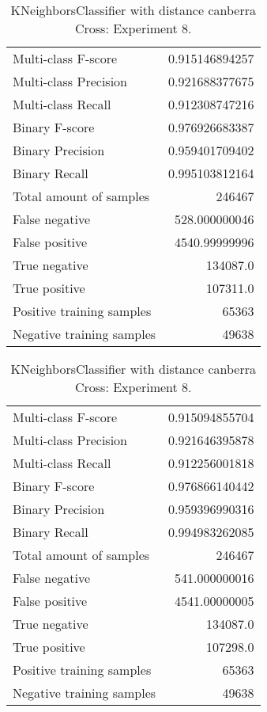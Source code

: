 \begin{table}[H]
\begin{minipage}{0.5\textwidth}
\caption{KNeighborsClassifier with distance canberra Cross: Experiment 7.}
\centering
\begin{tabular}{l r}
\toprule
Multi-class F-score & 0.915146894257 \\
Multi-class Precision & 0.921688377675 \\
Multi-class Recall & 0.912308747216 \\
\midrule
Binary F-score & 0.976926683387 \\
Binary Precision & 0.959401709402 \\
Binary Recall & 0.995103812164 \\
\midrule
Total amount of samples & 246467 \\
False negative & 528.000000046 \\
False positive & 4540.99999996 \\
True negative & 134087.0 \\
True positive & 107311.0 \\
\midrule
Positive training samples & 65363 \\
Negative training samples & 49638 \\
\bottomrule
\end{tabular}
\end{minipage}
\hfillx
\begin{minipage}{0.5\textwidth}
\caption{KNeighborsClassifier with distance canberra Cross: Experiment 8.}
\centering
\begin{tabular}{l r}
\toprule
Multi-class F-score & 0.915094855704 \\
Multi-class Precision & 0.921646395878 \\
Multi-class Recall & 0.912256001818 \\
\midrule
Binary F-score & 0.976866140442 \\
Binary Precision & 0.959396990316 \\
Binary Recall & 0.994983262085 \\
\midrule
Total amount of samples & 246467 \\
False negative & 541.000000016 \\
False positive & 4541.00000005 \\
True negative & 134087.0 \\
True positive & 107298.0 \\
\midrule
Positive training samples & 65363 \\
Negative training samples & 49638 \\
\bottomrule
\end{tabular}
\end{minipage}
\end{table}
